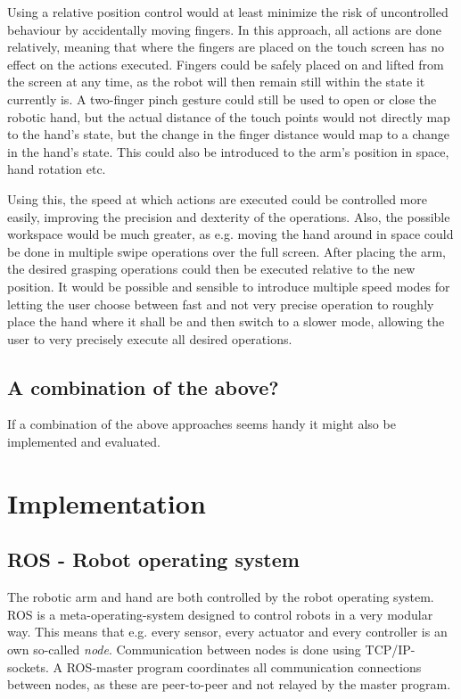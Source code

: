 \documentclass[a4paper]{article}
\begin{document}
Using a relative position control would at least minimize the risk of uncontrolled behaviour by accidentally moving fingers. In this approach, all actions are done relatively, meaning that where the fingers are placed on the touch screen has no effect on the actions executed. Fingers could be safely placed on and lifted from the screen at any time, as the robot will then remain still within the state it currently is. A two-finger pinch gesture could still be used to open or close the robotic hand, but the actual distance of the touch points would not directly map to the hand's state, but the change in the finger distance would map to a change in the hand's state. This could also be introduced to the arm's position in space, hand rotation etc.

Using this, the speed at which actions are executed could be controlled more easily, improving the precision and dexterity of the operations. Also, the possible workspace would be much greater, as e.g. moving the hand around in space could be done in multiple swipe operations over the full screen. After placing the arm, the desired grasping operations could then be executed relative to the new position. It would be possible and sensible to introduce multiple speed modes for letting the user choose between fast and not very precise operation to roughly place the hand where it shall be and then switch to a slower mode, allowing the user to very precisely execute all desired operations.

\subsection{A combination of the above?}

If a combination of the above approaches seems handy it might also be implemented and evaluated. 

\section{Implementation}
\label{sec:impl}
\subsection{ROS - Robot operating system}

The robotic arm and hand are both controlled by the robot operating system. ROS is a meta-operating-system designed to control robots in a very modular way. This means that e.g. every sensor, every actuator and every controller is an own so-called \textit{node}. Communication between nodes is done using TCP/IP-sockets. A ROS-master program coordinates all communication connections between nodes, as these are peer-to-peer and not relayed by the master program.
\end{document}
